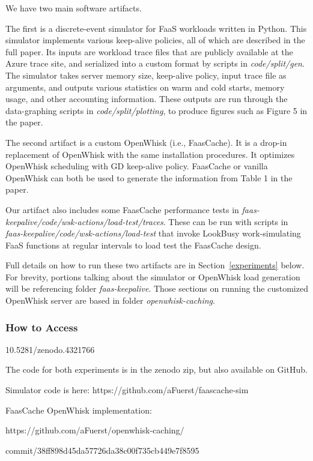 We have two main software artifacts.

The first is a discrete-event simulator for FaaS workloads written in Python.
This simulator implements various keep-alive policies, all of which are described in the full paper.
Its inputs are workload trace files that are publicly available at the Azure trace site, and serialized into a custom format by scripts in {\em code/split/gen}.
The simulator takes server memory size, keep-alive policy, input trace file as arguments, and outputs various statistics on warm and cold starts, memory usage, and other accounting information. 
These outputs are run through the data-graphing scripts in {\em code/split/plotting}, to produce figures such as Figure 5 in the paper.

The second artifact is a custom OpenWhisk (i.e., FaasCache).
It is a drop-in replacement of OpenWhisk with the same installation procedures.
It optimizes OpenWhisk scheduling with GD keep-alive policy.
FaasCache or vanilla OpenWhisk can both be used to generate the information from Table 1 in the paper.

Our artifact also includes some FaasCache performance tests in {\em faas-keepalive/code/wsk-actions/load-test/traces}.
These can be run with scripts in {\em faas-keepalive/code/wsk-actions/load-test} that invoke LookBusy work-simulating FaaS functions at regular intervals to load test the FaasCache design.

Full details on how to run these two artifacts are in Section~\ref{experiments} below.
For brevity, portions talking about the simulator or OpenWhisk load generation will be referencing folder {\em faas-keepalive}.
Those sections on running the customized OpenWhisk server are based in folder {\em openwhisk-caching}.

\subsubsection{How to Access}

10.5281/zenodo.4321766

The code for both experiments is in the zenodo zip, but also available on GitHub. 

\noindent Simulator code is here: https://github.com/aFuerst/faascache-sim

\noindent FaasCache OpenWhisk implementation:

https://github.com/aFuerst/openwhisk-caching/

commit/38ff898d45da57726da38c00f735cb449e7f8595



